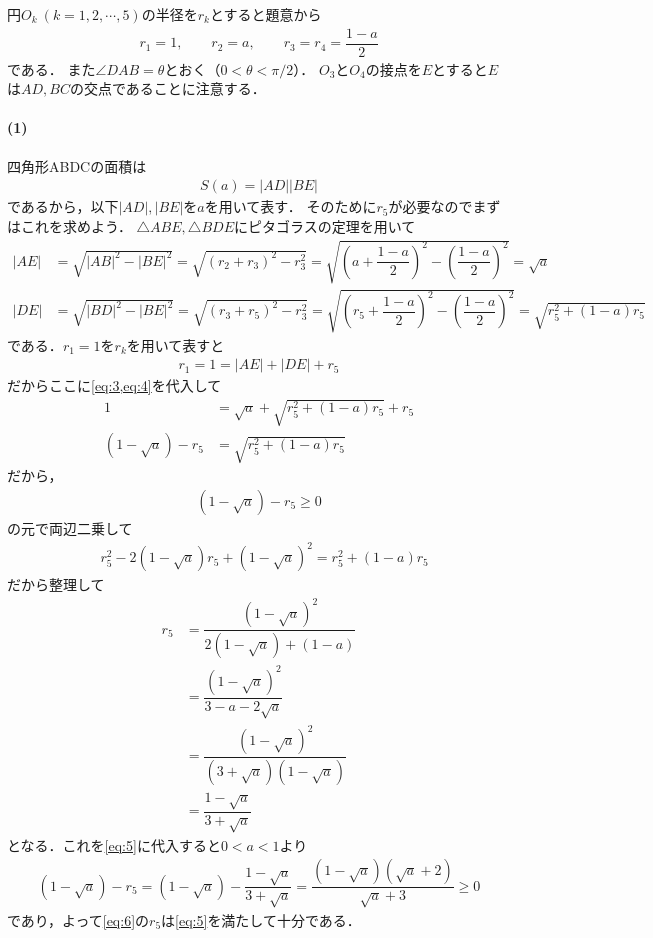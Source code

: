 \documentclass[../../main.tex]{subfiles}
\begin{document}
円$O_k\ (k=1,2,\cdots,5)$の半径を$r_k$とすると題意から
\begin{align}
  r_1=1, \qquad r_2=a, \qquad r_3=r_4=\dfrac{1-a}{2} \label{eq:1}
\end{align}
である．
また$\angle DAB=\theta$とおく（$0<\theta<\pi/2$）．
$O_3$と$O_4$の接点を$E$とすると$E$は$AD, BC$の交点であることに注意する．

\paragraph{(1)}
四角形ABDCの面積は
\begin{align}
  S(a) = |AD||BE| \label{eq:2}
\end{align}
であるから，以下$|AD|, |BE|$を$a$を用いて表す．
そのために$r_5$が必要なのでまずはこれを求めよう．
$\triangle ABE, \triangle BDE$にピタゴラスの定理を用いて
\begin{align}
  |AE|&=\sqrt{|AB|^2-|BE|^2}=\sqrt{(r_2+r_3)^2-r_3^2}=\sqrt{\left(a+\dfrac{1-a}{2}\right)^2-\left(\dfrac{1-a}{2}\right)^2}=\sqrt{a} \label{eq:3} \\
  |DE|&=\sqrt{|BD|^2-|BE|^2}=\sqrt{(r_3+r_5)^2-r_3^2}=\sqrt{\left(r_5+\dfrac{1-a}{2}\right)^2-\left(\dfrac{1-a}{2}\right)^2}=\sqrt{r_5^2+(1-a)r_5} \label{eq:4}
\end{align}
である．$r_1=1$を$r_k$を用いて表すと
\begin{align}
  r_1 = 1 = |AE|+|DE|+r_5
\end{align}
だからここに\cref{eq:3,eq:4}を代入して
\begin{align}
  1&=\sqrt{a}+\sqrt{r_5^2+(1-a)r_5}+r_5 \\
  (1-\sqrt{a})-r_5&=\sqrt{r_5^2+(1-a)r_5}
\end{align}
だから，
\begin{align}
  (1-\sqrt{a})-r_5\ge 0 \label{eq:5}
\end{align}
の元で両辺二乗して
\begin{align}
  & r_5^2-2(1-\sqrt{a})r_5+(1-\sqrt{a})^2=r_5^2+(1-a)r_5
\end{align}
だから整理して
\begin{align}
  r_5
  & =\dfrac{(1-\sqrt{a})^2}{2(1-\sqrt{a})+(1-a)} \\
  & =\dfrac{(1-\sqrt{a})^2}{3-a-2\sqrt{a}} \\
  & =\dfrac{(1-\sqrt{a})^2}{(3+\sqrt{a})(1-\sqrt{a})} \\
  & =\dfrac{1-\sqrt{a}}{3+\sqrt{a}} \label{eq:6}
\end{align}
となる．これを\cref{eq:5}に代入すると$0<a<1$より
\begin{align}
  (1-\sqrt{a})-r_5
  = (1-\sqrt{a})-\dfrac{1-\sqrt{a}}{3+\sqrt{a}}
  =\dfrac{(1-\sqrt{a})(\sqrt{a}+2)}{\sqrt{a}+3} \ge 0
\end{align}
であり，よって\cref{eq:6}の$r_5$は\cref{eq:5}を満たして十分である．
\end{document}

